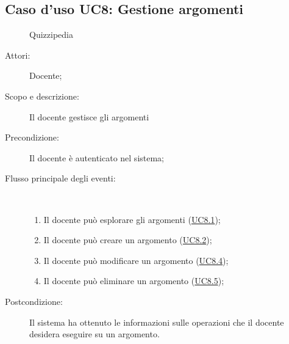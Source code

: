 \subsection{Caso d'uso UC8: Gestione argomenti}
	\begin{figure}[H]
		\centering
		\begin{resizedtikzpicture}{\textwidth}
		\begin{umlsystem}[x=0, fill=lightgray!20]{Quizzipedia}
		\end{umlsystem}
		\end{resizedtikzpicture}
		\caption{}
	\end{figure}
\begin{description}
\item[Attori:] Docente;
\item[Scopo e descrizione:] Il docente gestisce gli argomenti
      \item[Precondizione:] Il docente è autenticato nel sistema;

        \item[Flusso principale degli eventi:] \ 
 \begin{enumerate}
          \item Il docente può esplorare gli argomenti (\hyperlink{UC8.1}{UC8.1});
          \item Il docente può creare un argomento (\hyperlink{UC8.2}{UC8.2});
          \item Il docente può modificare un argomento (\hyperlink{UC8.4}{UC8.4});
          \item Il docente può eliminare un argomento (\hyperlink{UC8.5}{UC8.5});

      \end{enumerate}
    \item[Postcondizione:] Il sistema ha ottenuto le informazioni sulle operazioni che il docente desidera eseguire su un argomento.
  \end{description}
\hypertarget{UC8.1}{}
